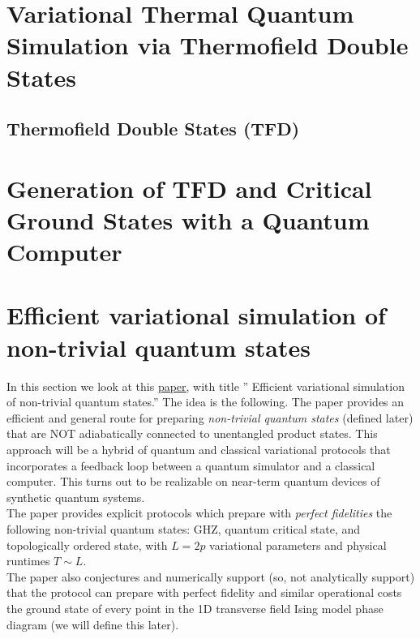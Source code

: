 \documentclass{book}
\theoremstyle{definition}
\begin{document}
\newpage



\section{Variational Thermal Quantum Simulation via Thermofield Double States}



\subsection{Thermofield Double States (TFD)}


\newpage



\section{Generation of TFD and Critical Ground States with a Quantum Computer }



\newpage






\section{Efficient variational simulation of non-trivial quantum states}


In this section we look at this \href{https://arxiv.org/pdf/1803.00026.pdf}{\underline{paper}}, with title '' Efficient variational simulation of non-trivial quantum states.'' The idea is the following. The paper provides an efficient and general route for preparing \textit{non-trivial quantum states} (defined later) that are NOT adiabatically connected to unentangled product states. This approach will be a hybrid of quantum and classical variational protocols that incorporates a feedback loop between a quantum simulator and a classical computer. This turns out to be realizable on near-term quantum devices of synthetic quantum systems. \\

The paper provides explicit protocols which prepare with \textit{perfect fidelities} the following non-trivial quantum states: GHZ, quantum critical state, and topologically ordered state, with $L=2p$ variational parameters and physical runtimes $T \sim L$. \\

The paper also conjectures and numerically support (so, not analytically support) that the protocol can prepare with perfect fidelity and similar operational costs the ground state of every point in the 1D transverse field Ising model phase diagram (we will define this later). 
\end{document}
